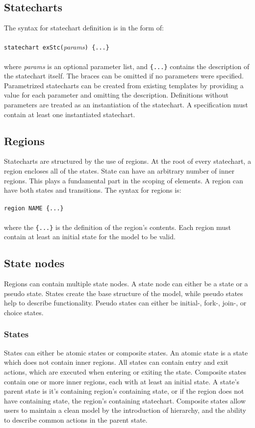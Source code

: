   \subsection{Statecharts}
The syntax for statechart definition is in the form of:
\\\\\verb!statechart exStc(!\textit{params}\verb!) {...}!\\\\
where \textit{params} is an optional parameter list, and \verb!{...}! contains the description of the statechart itself. The braces can be omitted if no parameters were specified. Parametrized statecharts can be created from existing templates by providing a value for each parameter and omitting the description. Definitions without parameters are treated as an instantiation of the statechart. A specification must contain at least one instantiated statechart.
  \subsection{Regions}
Statecharts are structured by the use of regions. At the root of every statechart, a region encloses all of the states. State can have an arbitrary number of inner regions. This plays a fundamental part in the scoping of elements. A region can have both states and transitions. The syntax for regions is:
\\\\\verb!region NAME {...}!\\\\
where the \verb!{...}! is the definition of the region's contents. Each region must contain at least an initial state for the model to be valid.
  \subsection{State nodes}
Regions can contain multiple state nodes. A state node can either be a state or a pseudo state. States create the base structure of the model, while pseudo states help to describe functionality. Pseudo states can either be initial-, fork-, join-, or choice states.
    \subsubsection{States}
States can either be atomic states or composite states. An atomic state is a state which does not contain inner regions. All states can contain entry and exit actions, which are executed when entering or exiting the state. Composite states contain one or more inner regions, each with at least an initial state. A state's parent state is it's containing region's containing state, or if the region does not have containing state, the region's containing statechart. Composite states allow users to maintain a clean model by the introduction of hierarchy, and the ability to describe common actions in the parent state.
